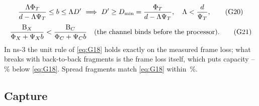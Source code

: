 \documentclass[11pt,a4paper]{article}
\begin{document}
\begin{equation}
\frac{\Lambda\Phi_T}{d-\Lambda\Psi_T}\le b\le\Lambda D'\ \Longrightarrow\ D'\ge D_{\min}=\frac{\Phi_T}{d-\Lambda\Psi_T},\quad \Lambda<\frac{d}{\Psi_T}, \tag{G20}\label{eq:G20}
\end{equation}
\begin{equation}
\frac{\mathrm{B}_X}{\Phi_X+\Psi_X b}<\frac{\mathrm{B}_C}{\Phi_C+\Psi_C b}\quad\text{(the channel binds before the processor)}. \tag{G21}\label{eq:G21}
\end{equation}
In ns-3 the unit rule of \eqref{eq:G18} holds exactly on the measured frame loss; what breaks with
back-to-back fragments is the frame loss itself, which puts capacity \fragCapMin--\fragCapMax\,\%
below \eqref{eq:G18}. Spread fragments match \eqref{eq:G18} within \fragSpread\,\%.

\subsection{Capture}
\end{document}
